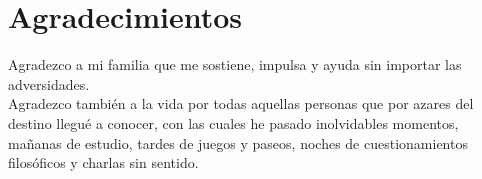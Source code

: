 \chapter{Agradecimientos}
Agradezco a mi familia que me sostiene, impulsa
y ayuda sin importar las adversidades.\\

Agradezco también a la vida por todas aquellas personas 
que por azares del destino llegué a conocer, con las 
cuales he pasado inolvidables momentos, mañanas de estudio,
tardes de juegos y paseos, noches de cuestionamientos 
filosóficos y charlas sin sentido.\\